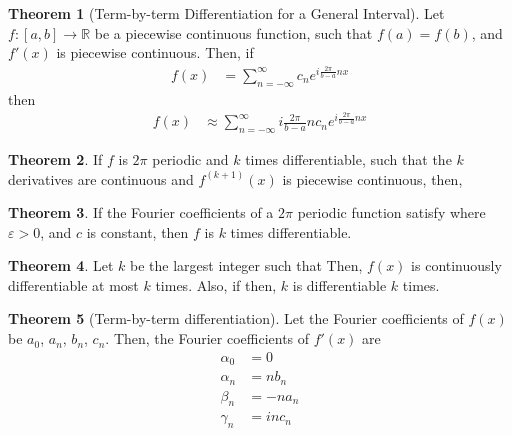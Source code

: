 \documentclass[fleqn, 8pt]{amsart}
\theoremstyle{definition}
\theoremstyle{theorem}
\newtheorem{theorem}{Theorem}
\begin{document}
\begin{multicols}{2}
\begin{spacing}{0.7}
\begin{theorem}[Term-by-term Differentiation for a General Interval]
	Let $f : [a,b] \to \mathbb{R}$ be a piecewise continuous function, such that $f(a) = f(b)$, and $f'(x)$ is piecewise continuous.
	Then, if
	\begin{align*}
		f(x) &= \sum\limits_{n = -\infty}^{\infty} c_n e^{i \frac{2 \pi}{b - a} n x}
	\end{align*}
	then
	\begin{align*}
		f(x) &\approx \sum\limits_{n = -\infty}^{\infty} i \frac{2 \pi}{b - a} n c_n e^{i \frac{2 \pi}{b - a} n x}
	\end{align*}
	\label{thm:Term-by-term_Differentiation_for_a_General_Interval}
\end{theorem}

\begin{theorem}
	If $f$ is $2 \pi$ periodic and $k$ times differentiable, such that the $k$ derivatives are continuous and $f^{(k + 1)}(x)$ is piecewise continuous, then,
\end{theorem}

\begin{theorem}
	If the Fourier coefficients of a $2 \pi$ periodic function satisfy
	where $\varepsilon > 0$, and $c$ is constant, then $f$ is $k$ times differentiable.
\end{theorem}

\begin{theorem}
	Let $k$ be the largest integer such that
	Then, $f(x)$ is continuously differentiable at most $k$ times.
	Also, if
	then, $k$ is differentiable $k$ times.
\end{theorem}

\begin{theorem}[Term-by-term differentiation]
	Let the Fourier coefficients of $f(x)$ be $a_0$, $a_n$, $b_n$, $c_n$.
	Then, the Fourier coefficients of $f'(x)$ are
	\begin{align*}
		\alpha_0 &= 0\\
		\alpha_n &= n b_n\\
		\beta_n &= -n a_n\\
		\gamma_n &= i n c_n
	\end{align*}
\end{theorem}


\end{spacing}
\end{multicols}
\end{document}
